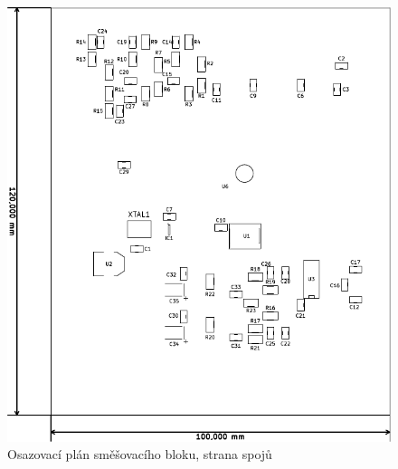\begin{figure}[H]
	\centering
	\includegraphics[width=170mm]{img/mix/os_b.pdf}
	\caption{Osazovací plán směšovacího bloku, strana spojů}    		
\end{figure}

